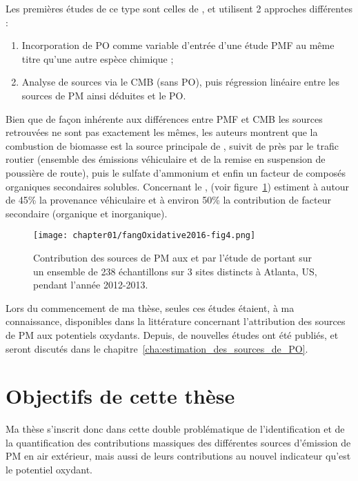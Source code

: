 Les premières études de ce type sont celles de
\cite{vermaReactive2014,batesReactive2015,fangOxidative2016}, et utilisent 2 approches
différentes :
\begin{enumerate}
    \item Incorporation de PO comme variable d'entrée d'une étude PMF au même titre qu'une
        autre espèce chimique ;
    \item Analyse de sources via le CMB (sans PO), puis régression linéaire entre les
        sources de PM ainsi déduites et le PO.
\end{enumerate}
Bien que de façon inhérente aux différences entre PMF et CMB les sources retrouvées ne
sont pas exactement les mêmes, les auteurs montrent que la combustion de biomasse est la source
principale de \PODTTv, suivit de près par le trafic routier (ensemble des émissions
véhiculaire et de la remise en suspension de poussière de route), puis le sulfate
d'ammonium et enfin un facteur de composés organiques secondaires solubles.
Concernant le \POAAv, \cite{fangOxidative2016} (voir
figure~\ref{fig:chapter01/fangOxidative2016-fig4}) estiment à autour de 45\% la
provenance véhiculaire et à environ 50\% la contribution de facteur secondaire (organique
et inorganique).

\begin{figure}[ht]
    \centering
    \texttt{[image: chapter01/fangOxidative2016-fig4.png]}
    \caption{Contribution des sources de PM aux \POAAv{} et \PODTTv{} par l'étude de
    \cite{fangOxidative2016} portant sur un ensemble de 238 échantillons sur 3 sites
        distincts à Atlanta, US, pendant l'année 2012-2013.}%
    \label{fig:chapter01/fangOxidative2016-fig4}
\end{figure}

Lors du commencement de ma thèse, seules ces études étaient, à ma connaissance,
disponibles dans la littérature concernant l'attribution des sources de PM aux potentiels
oxydants.  Depuis, de nouvelles études ont été publiés, et seront discutés dans le
chapitre~\ref{cha:estimation_des_sources_de_PO}.


\section{Objectifs de cette thèse}%
\label{sec:positionnement_de_cette_thèse}

Ma thèse s'inscrit donc dans cette double problématique de l'identification et de la
quantification des contributions massiques des différentes sources d'émission de PM en air
extérieur, mais aussi de leurs contributions au nouvel indicateur qu'est le potentiel
oxydant.


